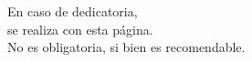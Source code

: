 
\cleardoublepage
\thispagestyle{empty} %

\begin{minipage}[c][\textheight][c]{\textwidth} %
\raggedleft %


En caso de dedicatoria, \\
se realiza con esta página.\\
No es obligatoria, si bien es recomendable.

\bigskip

\emph{\tfgauthorname}

\end{minipage}

\blankpage

